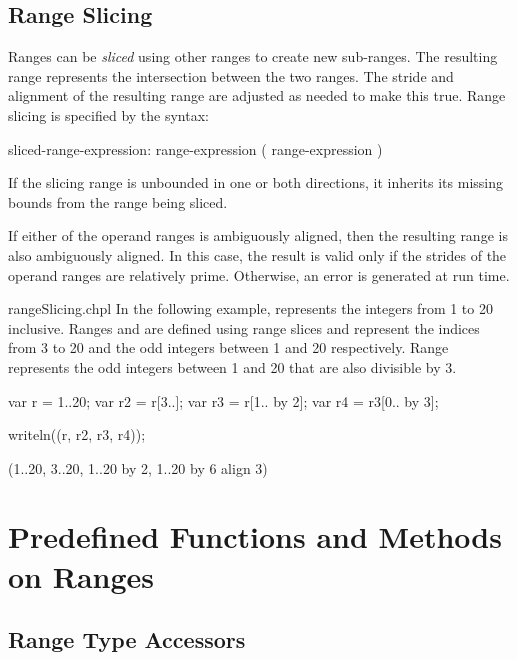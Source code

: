 \subsection{Range Slicing}
\label{Range_Slicing}

Ranges can be \emph{sliced} using other ranges to create new
sub-ranges.  The resulting range represents the intersection between
the two ranges.  The stride and alignment of the resulting range are adjusted as
needed to make this true.  Range slicing is specified by the syntax:
\begin{syntax}
sliced-range-expression:
  range-expression ( range-expression )
\end{syntax}
\noindent If the slicing range is unbounded in one or both directions, it
inherits its missing bounds from the range being sliced.

If either of the operand ranges is ambiguously aligned, then the resulting range
is also ambiguously aligned.  In this case, the result is valid only if the
strides of the operand ranges are relatively prime.  Otherwise, an error is
generated at run time.

\begin{chapelexample}{rangeSlicing.chpl}
In the following example,  represents the integers from 1 to
20 inclusive.  Ranges  and  are defined using range
slices and represent the indices from 3 to 20 and the odd integers
between 1 and 20 respectively. Range  represents the odd
integers between 1 and 20 that are also divisible by 3.
\begin{chapel}
var r = 1..20;
var r2 = r[3..];
var r3 = r[1.. by 2];
var r4 = r3[0.. by 3];
\end{chapel}
\begin{chapelpost}
writeln((r, r2, r3, r4));
\end{chapelpost}
\begin{chapeloutput}
(1..20, 3..20, 1..20 by 2, 1..20 by 6 align 3)
\end{chapeloutput}
\end{chapelexample}

\section{Predefined Functions and Methods on Ranges}

\subsection{Range Type Accessors}

